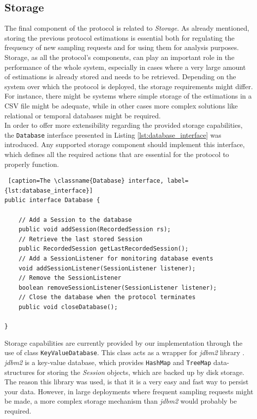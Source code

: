 \documentclass[a4paper,11pt,twoside]{report}
\newcommand{\classname}[1]{\texttt{#1}}
\begin{document}
\subsection{Storage}

The final component of the protocol is related to \textit{Storage}. As already mentioned, storing the previous protocol estimations is essential both for regulating the frequency of new sampling requests and for using them for analysis purposes. \\

Storage, as all the protocol's components, can play an important role in the performance of the whole system, especially in cases where a very large amount of estimations is already stored and needs to be retrieved. Depending on the system over which the protocol is deployed, the storage requirements might differ. For instance, there might be systems where simple storage of the estimations in a CSV file might be adequate, while in other cases more complex solutions like relational or temporal databases might be required.\\

In order to offer more extensibility regarding the provided storage capabilities, the \classname{Database} interface presented in Listing \ref{lst:database_interface} was introduced. Any supported storage component should implement this interface, which defines all the required actions that are essential for the protocol to properly function. 

\begin{lstlisting} [caption=The \classname{Database} interface, label={lst:database_interface}]
public interface Database {

	// Add a Session to the database
	public void addSession(RecordedSession rs);
	// Retrieve the last stored Session
	public RecordedSession getLastRecordedSession();
	// Add a SessionListener for monitoring database events
	void addSessionListener(SessionListener listener);
	// Remove the SessionListener
	boolean removeSessionListener(SessionListener listener);
	// Close the database when the protocol terminates
	public void closeDatabase();
	
}
\end{lstlisting}

Storage capabilities are currently provided by our implementation through the use of class \classname{KeyValueDatabase}. This class acts as a wrapper for \textit{jdbm2} library \cite{citeulike:10520984}. \textit{jdbm2} is a key-value database, which provides \classname{HashMap} and \classname{TreeMap} data-structures for storing the \textit{Session} objects, which are backed up by disk storage. The reason this library was used, is that it is a very easy and fast way to persist your data. However, in large deployments where frequent sampling requests might be made, a more complex storage mechanism than \textit{jdbm2} would probably be required.
 
\end{document}
